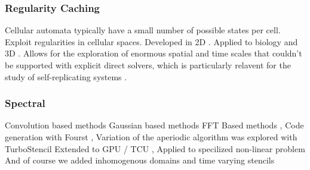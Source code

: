 \subsubsection{Regularity Caching}
Cellular automata typically have a small number of possible states per cell.
Exploit regularities in cellular spaces.
Developed in 2D \cite{Gosper1984HashLife}.
Applied to biology and 3D \cite{Caux2010HashLife}.
Allows for the exploration of enormous spatial and time scales that couldn't be supported with explicit direct solvers, which is particularly relavent for the study of self-replicating systems \cite{Hutton2010Codd, Stevens2011Cellular}.

\subsubsection{Spectral}
\begin{outline}
  \1 Convolution based methods  \cite{Januario2016}
  \1 Gaussian based methods \cite{Ahmad2025Gaussian}
  \1 FFT Based methods \cite{Ahmad2021, Ahmad2023},
  \2 Code generation with Fourst \cite{Ahmad2022},
  \2 Variation of the aperiodic algorithm was explored with TurboStencil \cite{Liu2023Turbo}
  \2 Extended to GPU / TCU \cite{Han2025FlashFFT},
  \1 Applied to specilized non-linear problem \cite{Ahmad2024Option} 
  \1 And of course we added inhomogenous domains and time varying stencils \cite{Bentley2025Fast}
\end{outline}

